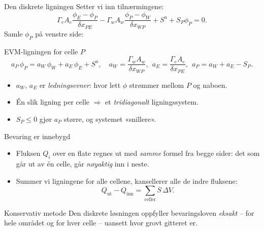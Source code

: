 \documentclass[11pt,aspectratio=169]{beamer}
\begin{document}
\begin{frame}{Den diskrete ligningen}
Setter vi inn tilnærmingene:
\[
\Gamma_eA_e\frac{\phi_E-\phi_P}{\delta x_{PE}} - \Gamma_wA_w\frac{\phi_P-\phi_W}{\delta x_{WP}} + S^u + S_P\phi_P = 0 .
\]
Samle $\phi_P$ på venstre side:
\begin{oppsumb}{EVM-ligningen for celle $P$}
\[
a_P\,\phi_P = a_W\,\phi_W + a_E\,\phi_E + S^u,
\quad
a_W = \frac{\Gamma_wA_w}{\delta x_{WP}},\ \ a_E = \frac{\Gamma_eA_e}{\delta x_{PE}},\ \ a_P = a_W + a_E - S_P .
\]
\end{oppsumb}
\begin{itemize}
\item $a_W$, $a_E$ er \emph{ledningsevner}: hvor lett $\phi$ strømmer mellom $P$ og naboen.
\item Én slik ligning per celle $\Rightarrow$ et \emph{tridiagonalt} ligningssystem.
\item $S_P\le 0$ gjør $a_P$ større, og systemet «snillere».
\end{itemize}
\end{frame}

\begin{frame}{Bevaring er innebygd}
\begin{center}
\end{center}
\begin{itemize}
\item Fluksen $Q_i$ over en flate regnes ut med \emph{samme} formel fra begge sider: det som går ut av én celle, går \emph{nøyaktig} inn i neste.
\item Summer vi ligningene for alle cellene, kansellerer alle de indre fluksene:
\[
Q_{\text{ut}} - Q_{\text{inn}} = \sum_{\text{celler}} \overline S\,\Delta V .
\]
\end{itemize}
\begin{remb}{Konservativ metode}
Den diskrete løsningen oppfyller bevaringsloven \emph{eksakt} -- for hele området og for hver celle -- uansett hvor grovt gitteret er.
\end{remb}
\end{frame}
\end{document}
